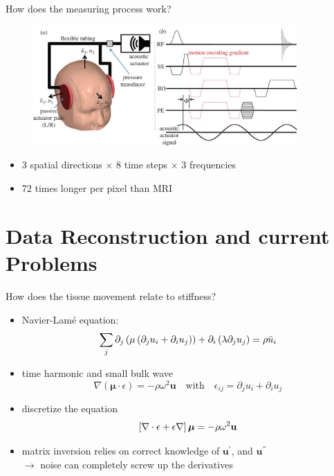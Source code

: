 \begin{frame}{How does the measuring process work?}

\begin{figure}
\includegraphics[width=0.9\textwidth]{Images/experiment.jpg}
\centering\end{figure}

\begin{itemize}
 \item<2-> 3 spatial directions $\times$ 8 time steps $\times$ 3 frequencies
 \item<3-> 72 times longer per pixel than MRI 
\end{itemize}

\end{frame}

\section{Data Reconstruction and current Problems}

\begin{frame}{How does the tissue movement relate to stiffness?}


\begin{itemize}
 \item<2-> Navier-Lam\'{e} equation:
 \begin{equation}
 \sum_ j \partial_j \left(  \mu \left(  \partial_j u_i + \partial_i u_j \right) \right) + \partial_i \left( \lambda \partial_j u_j \right) = \rho \ddot{u}_i
\end{equation}
\item<3-> time harmonic and small bulk wave
 \begin{equation}
 \nabla(\bm{\mu}  \cdot \epsilon) = -\rho \omega^2 \mathbf{u} \quad \text{with} \quad \epsilon_{ij} = \partial_j u_i + \partial_i u_j
\end{equation}
 \item<4-> discretize the equation
 \begin{equation}
 \left[ \nabla\cdot\epsilon + \epsilon\nabla \right] \bm{\mu} = -\rho \omega^2 \mathbf{u}
\end{equation}
 \item<5-> matrix inversion relies on correct knowledge of $\mathbf{u}^{'}$, and $\mathbf{u}^{''}$\\
 $\rightarrow$ noise can completely screw up the derivatives
\end{itemize}

\end{frame}


